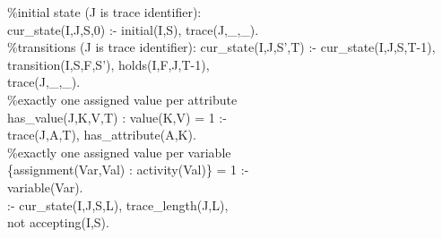 \begin{small}
\begin{aspcode}
\noindent
\%initial state (J is trace identifier):\\
cur\_state(I,J,S,0) :- initial(I,S), trace(J,\_,\_).\\

\noindent
\%transitions (J is trace identifier):
cur\_state(I,J,S',T) :- cur\_state(I,J,S,T-1),\\
\phantom{cur\_state}transition(I,S,F,S'), holds(I,F,J,T-1),\\
\phantom{cur\_state}trace(J,\_,\_).\\

\noindent
\%exactly one assigned value per attribute\\
{has\_value(J,K,V,T) : value(K,V)} = 1 :- \\
\phantom{has\_value}trace(J,A,T), has\_attribute(A,K).\\

\noindent
\%exactly one assigned value per variable\\
\{assignment(Var,Val) : activity(Val)\} = 1 :- \\
variable(Var).\\

\noindent
:- cur\_state(I,J,S,L), trace\_length(J,L),\\
\phantom{:- }not accepting(I,S).\\

\end{aspcode}
\end{small}
